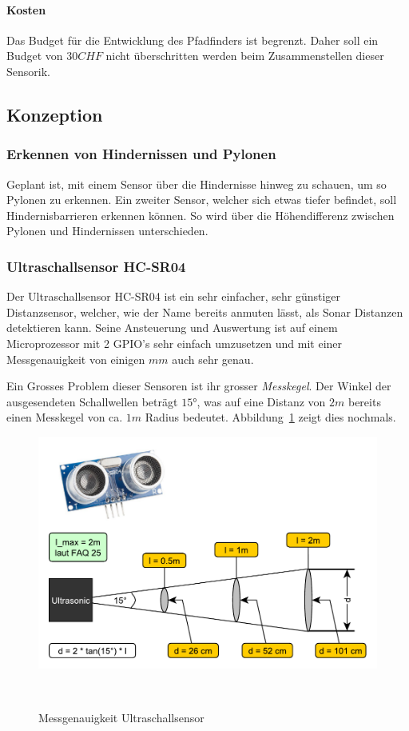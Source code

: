 \documentclass[main.tex]{subfiles} %
\begin{document}
\paragraph{Kosten}
Das Budget für die Entwicklung des Pfadfinders ist begrenzt. Daher soll ein
Budget von $30 CHF$ nicht überschritten werden beim Zusammenstellen dieser
Sensorik.

\subsection*{Konzeption}

\subsubsection{Erkennen von Hindernissen und Pylonen}
Geplant ist, mit einem Sensor über die Hindernisse hinweg zu schauen, um so
Pylonen zu erkennen. Ein zweiter Sensor, welcher sich etwas tiefer befindet,
soll Hindernisbarrieren erkennen können. So wird über die Höhendifferenz
zwischen Pylonen und Hindernissen unterschieden.

\subsubsection*{Ultraschallsensor HC-SR04}
Der Ultraschallsensor HC-SR04 ist ein sehr einfacher, sehr günstiger Distanzsensor, welcher,
wie der Name bereits anmuten lässt, als Sonar Distanzen detektieren kann.
Seine Ansteuerung und Auswertung ist auf einem Microprozessor mit 2 GPIO's
sehr einfach umzusetzen und mit einer Messgenauigkeit von einigen $mm$ auch sehr genau.

Ein Grosses Problem dieser Sensoren ist ihr grosser \textit{Messkegel}. Der
Winkel der ausgesendeten Schallwellen beträgt $15°$, was auf eine Distanz von
$2m$ bereits einen Messkegel von ca. $1 m$ Radius bedeutet.
Abbildung~\ref{fig:Genauigkeit_Ultraschallsensor} zeigt dies nochmals.

\begin{figure}[h!]
    \centering
    \includegraphics[width=0.75\linewidth]{./fig_Hinderniserkennung/Auslesegenauigkeit_Ultraschall.pdf}
    \caption{Messgenauigkeit Ultraschallsensor}~\label{fig:Genauigkeit_Ultraschallsensor}
\end{figure}
\end{document}
